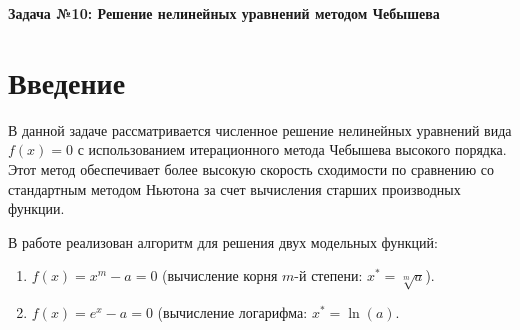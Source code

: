 \documentclass[12pt, a4paper]{article}
\theoremstyle{definition}
\begin{document}
\begin{center}
    \Large\bfseries Задача №10: Решение нелинейных уравнений методом Чебышева \\
\end{center}

\vspace{0.5cm}

\section{Введение}
В данной задаче рассматривается численное решение нелинейных уравнений вида $f(x) = 0$ с использованием итерационного метода Чебышева высокого порядка. Этот метод обеспечивает более высокую скорость сходимости по сравнению со стандартным методом Ньютона за счет вычисления старших производных функции.

В работе реализован алгоритм для решения двух модельных функций:
\begin{enumerate}
    \item $f(x) = x^m - a = 0$ (вычисление корня $m$-й степени: $x^* = \sqrt[m]{a}$).
    \item $f(x) = e^x - a = 0$ (вычисление логарифма: $x^* = \ln(a)$.
\end{enumerate}
\end{document}

